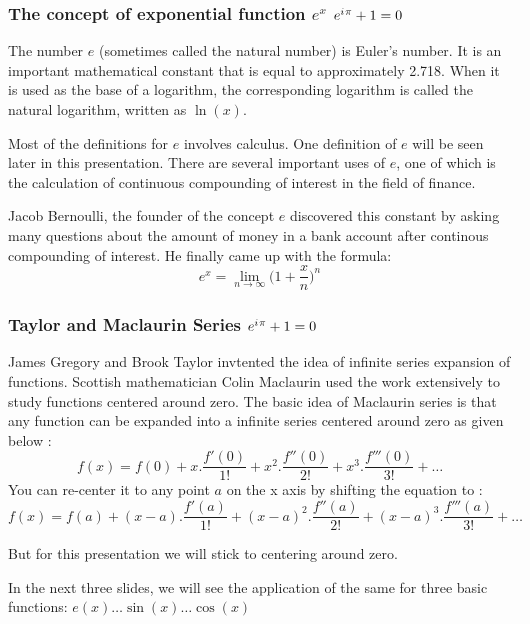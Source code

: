 \documentclass[10pt]{beamer}
\newcommand{\iu}{{i\mkern1mu}}
\begin{document}
\begin{frame}
	\frametitle{The concept of exponential function $e^x$ \hspace{25pt} \textcolor{pink}{\Huge\(e^{\iu \pi} +1 = 0\)}}
	
The number $e$ (sometimes called the natural number) is Euler's number. It is an important mathematical constant that is equal to approximately 2.718. When it is used as the base of a logarithm, the corresponding logarithm is called the natural logarithm, written as $\ln(x)$. \vspace{10pt}

Most of the definitions for $e$ involves calculus. One definition of $e$ will be seen later in this presentation. There are several important uses of $e$, one of which is the calculation of continuous compounding of interest in the field of finance. \vspace{10pt}

Jacob Bernoulli, the founder of the concept $e$ discovered this constant by asking many questions about the amount of money in a bank account after continous compounding of interest. He finally came up with the formula: \\

$$e^x = \lim_{n\to\infty}\Big(1+\dfrac{x}{n}\Big)^n$$
	
\end{frame}
\begin{frame}
	\frametitle{Taylor and Maclaurin Series \hspace{25pt} \textcolor{pink}{\Huge\(e^{\iu \pi} +1 = 0\)}}
	James Gregory and Brook Taylor invtented the idea of infinite series expansion of functions.  Scottish mathematician Colin Maclaurin used the work extensively to study functions centered around zero.  The basic idea of Maclaurin series is that any function can be expanded into a infinite series centered around zero as given below :
	{\large {$$f(x) = f(0)+x.\dfrac{f'(0)}{1!}+ x^2.\dfrac{f''(0)}{2!} +x^3.\dfrac{f'''(0)}{3!} + \dots$$}}
	You can re-center it to any point $a$ on the x axis by shifting the equation to  :
	{\large {$$f(x) = f(a)+(x-a).\dfrac{f'(a)}{1!}+ (x-a)^2.\dfrac{f''(a)}{2!} +(x-a)^3.\dfrac{f'''(a)}{3!} + \dots$$}}
	
	But for this presentation we will stick to centering around zero. 
	\vspace{10pt}

	In the next three slides, we will see the application of the same for three basic functions: $e(x) \dots \sin(x) \dots \cos(x)$
\end{frame}
\end{document}
